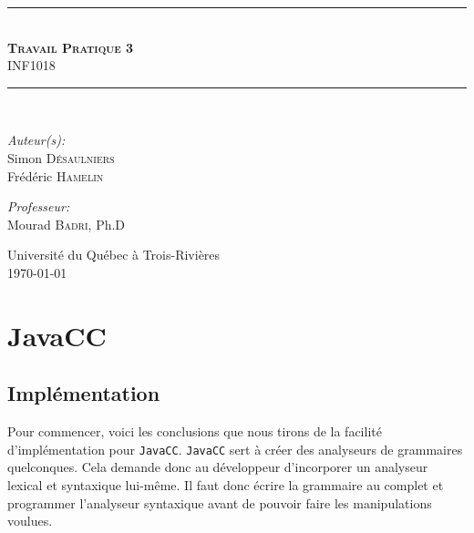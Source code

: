 \documentclass[11pt,french]{article}
\begin{document}
    \begin{titlepage}
        \begin{center}
            \noindent\rule{13cm}{1pt}\\[0.4cm]
            \textsc{\huge \bfseries Travail Pratique 3}\\
                                    INF1018\\[0.4cm]
            \noindent\rule{13cm}{1pt}\\[5cm]

            \begin{minipage}{0.4\textwidth}
                \begin{flushleft}
                \large\emph{Auteur(s):}\\[0.5cm]
                    Simon \textsc{Désaulniers}\\
                    Frédéric \textsc{Hamelin}
                \end{flushleft}
            \end{minipage}
            \begin{minipage}{0.5\textwidth}
                \begin{flushright} \large
                    \emph{Professeur:} \\[0.5cm]
                    Mourad \textsc{Badri}, Ph.D
                    \vspace{\parskip}
                \end{flushright}
            \end{minipage}

            \vfill
            {\large Université du Québec à Trois-Rivières\\ \today}
        \end{center}
        \thispagestyle{empty}
    \end{titlepage}

    \restoregeometry
    \setcounter{page}{1}


    \section{JavaCC} %
    \label{sec:javacc}
        \subsection{Implémentation} %
        \label{sub:implementation}
            Pour commencer, voici les conclusions que nous tirons de la facilité d'implémentation
            pour {\tt JavaCC}. {\tt JavaCC} sert à créer des analyseurs de grammaires quelconques.
            Cela demande donc au développeur d'incorporer un analyseur lexical et syntaxique
            lui-même.  Il faut donc écrire la grammaire au complet et programmer l'analyseur
            syntaxique avant de pouvoir faire les manipulations voulues.
\end{document}
